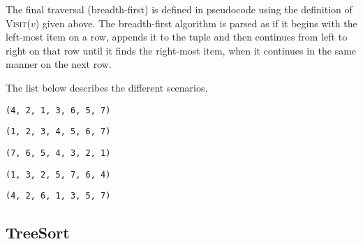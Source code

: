 \documentclass[a4paper,11pt]{article}
\begin{document}
The final traversal (breadth-first) is defined in pseudocode using the definition of \textsc{Visit}($v$) given above. The breadth-first algorithm is parsed as if it begins with the left-most item on a row, appends it to the tuple and then continues from left to right on that row until it finds the right-most item, when it continues in the same manner on the next row.

The list below describes the different scenarios.

\begin{description}[style=multiline,leftmargin=6cm]
\item[Pre-order] \texttt{(4, 2, 1, 3, 6, 5, 7)}
\item[In-order (Ascending)] \texttt{(1, 2, 3, 4, 5, 6, 7)}
\item[In-order (Descending)] \texttt{(7, 6, 5, 4, 3, 2, 1)}
\item[Post-order] \texttt{(1, 3, 2, 5, 7, 6, 4)}
\item[Breadth-first] \texttt{(4, 2, 6, 1, 3, 5, 7)}
\end{description}
\newpage
\subsection{TreeSort}
\end{document}
